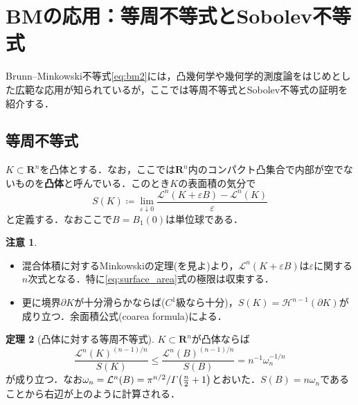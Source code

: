 \documentclass[a4j]{ltjsarticle}
\newcommand{\Rset}{\mathbf{R}}
\newcommand{\Lm}{\mathcal{L}}
\newcommand{\Hm}{\mathcal{H}}
\newcommand{\1}{\bm{1}}
\numberwithin{equation}{section}
\theoremstyle{definition}
\newtheorem{thm}{定理}[section]
\newtheorem{rmk}[thm]{注意}
\begin{document}
\section{BMの応用：等周不等式とSobolev不等式}
Brunn--Minkowski不等式\eqref{eq:bm2}には，凸幾何学や幾何学的測度論をはじめとした広範な応用が知られているが，ここでは等周不等式とSobolev不等式の証明を紹介する．
\subsection{等周不等式}
$K\subset\Rset^n$を凸体とする．なお，ここでは$\Rset^n$内のコンパクト凸集合で内部が空でないものを\textbf{凸体}と呼んでいる．このとき$K$の表面積の気分で
\begin{equation}
    S(K)\coloneqq \lim_{\varepsilon\downarrow 0}\frac{\Lm^n(K+\varepsilon B)-\Lm^n(K)}{\varepsilon} \label{eq:surface_area}
\end{equation}
と定義する．なおここで$B=B_{1}(0)$は単位球である．
\begin{rmk}
    \begin{itemize}
        \item 混合体積に対するMinkowskiの定理(\cite{Sch}を見よ)より，$\Lm^n(K+\varepsilon B)$は$\varepsilon$に関する$n$次式となる．特に\eqref{eq:surface_area}式の極限は収束する．
        \item 更に境界$\partial K$が十分滑らかならば($C^1$級なら十分)，$S(K)=\Hm^{n-1}(\partial K)$が成り立つ．余面積公式(coarea formula)による．
    \end{itemize}
\end{rmk}
\begin{thm}[凸体に対する等周不等式]
    $K\subset\Rset^n$が凸体ならば
    \begin{equation}
        \frac{\Lm^n(K)^{(n-1)/n}}{S(K)}\leq \frac{\Lm^n(B)^{(n-1)/n}}{S(B)}=n^{-1}\omega_n^{-1/n}\label{eq:isop_ineq_conv}\tag{IP1}
    \end{equation}
    が成り立つ．なお$\omega_n=\Lm^n(B)=\pi^{n/2}/\varGamma\qty(\frac{n}{2}+1)$とおいた．$S(B)=n\omega_n$であることから右辺が上のように計算される．
\end{thm}
\end{document}
